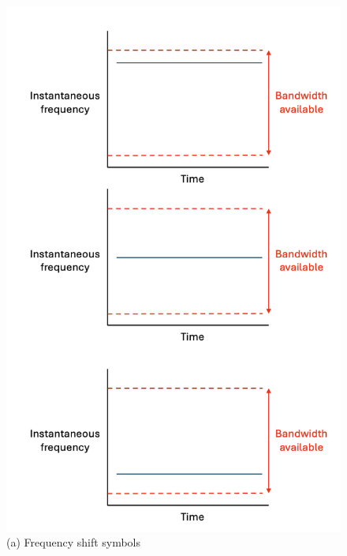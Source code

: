 \begin{figure}[H]
  \centering
  \begin{minipage}{0.48\textwidth}
    \centering
    \includegraphics[width=0.9\linewidth]{contents/part-1/fig1/traditional-wavechart.png}
    \\[4pt]
    {\small (a) Frequency shift symbols} \end{minipage}\hfill
  \begin{minipage}{0.48\textwidth}
    \centering

\end{minipage}
\end{figure}
